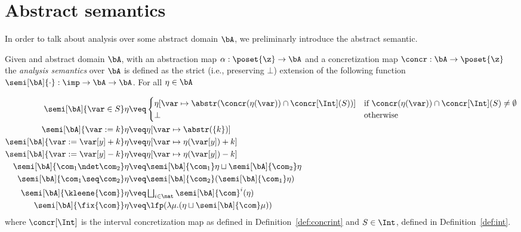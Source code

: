 \section{Abstract semantics}
\label{sec:abstractsem}

In order to talk about analysis over some abstract domain \(\bA\), we
preliminarly introduce the abstract semantic.

\begin{definition}\label{def:abstrsem}
  Given and abstract domain \(\bA\), with an abstraction map
  \({\alpha : \poset{\z} \to \bA}\) and a concretization map
  \({\concr : \bA \to \poset{\z}}\) the \emph{analysis semantics} over
  \(\bA\) is defined as the strict (i.e., preserving \(\bot\))
  extension of the following function
  \({\semi[\bA]{\cdot} : \imp \to \bA \to \bA}\). For all
  \(\eta \in \bA\)

  \begin{align*}
    \semi[\bA]{\var \in S}\eta 
    & \veq  
      \begin{cases}
        \eta[\var \mapsto \abstr(\concr(\eta(\var)) \cap \concr[\Int](S))] & \text{if }\concr(\eta(\var)) \cap \concr[\Int](S) \neq \emptyset \\
        \bot & \text{otherwise}
      \end{cases}\\
    \semi[\bA]{\var := k}\eta 
    & \veq \eta[\var \mapsto \abstr(\{k\})]\\
    \semi[\bA]{\var := \var[y] + k}\eta 
    & \veq \eta[\var \mapsto \eta (\var[y]) + k]\\
    \semi[\bA]{\var := \var[y] - k}\eta 
    & \veq \eta[\var \mapsto \eta (\var[y]) - k]\\
    \semi[\bA]{\com_1 \ndet \com_2} \eta
    & \veq \semi[\bA]{\com_1} \eta \sqcup \semi[\bA]{\com_2} \eta\\
    \semi[\bA]{\com_1 \seq \com_2} \eta
    & \veq \semi[\bA]{\com_2} (\semi[\bA]{\com_1} \eta)\\
    \semi[\bA]{\kleene{\com}} \eta
    & \veq \textstyle \bigsqcup_{i \in \nat} \semi[\bA]{\com}^i (\eta)\\
    \semi[\bA]{\fix{\com}} \eta
    & \veq  \lfp(\lambda \mu. (\eta \sqcup \semi[\bA]{\com} \mu))
  \end{align*}
  where \(\concr[\Int]\) is the interval concretization map as defined
  in Definition~\ref{def:concrint} and \(S \in \Int\), defined in
  Definition~\ref{def:int}.
\end{definition}

